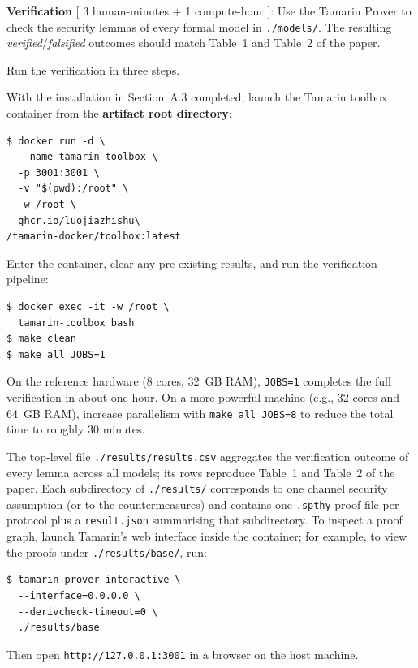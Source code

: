 \begin{compactdesc}

    \item[(E1):] \textbf{Verification} [ 3 human-minutes + 1 compute-hour ]: Use the Tamarin Prover to check the security lemmas of every formal model in \texttt{./models/}. The resulting \textit{verified}/\textit{falsified} outcomes should match Table~1 and Table~2 of the paper.

    \begin{asparadesc}

        \item[How to:] Run the verification in three steps.

       \item[Preparation:]
        With the installation in Section~A.3 completed, launch the Tamarin toolbox container from the \textbf{artifact root directory}:
\begin{verbatim}
$ docker run -d \
  --name tamarin-toolbox \
  -p 3001:3001 \
  -v "$(pwd):/root" \
  -w /root \
  ghcr.io/luojiazhishu\
/tamarin-docker/toolbox:latest
\end{verbatim}

        \item[Execution:]
        Enter the container, clear any pre-existing results, and run the verification pipeline:
\begin{verbatim}
$ docker exec -it -w /root \
  tamarin-toolbox bash
$ make clean
$ make all JOBS=1
\end{verbatim}
        On the reference hardware (8 cores, 32~GB RAM), \texttt{JOBS=1} completes the full verification in about one hour. On a more powerful machine (e.g., 32 cores and 64~GB RAM), increase parallelism with \texttt{make all JOBS=8} to reduce the total time to roughly 30 minutes.

        \item[Results:]
        The top-level file \texttt{./results/results.csv} aggregates the verification outcome of every lemma across all models; its rows reproduce Table~1 and Table~2 of the paper. Each subdirectory of \texttt{./results/} corresponds to one channel security assumption (or to the countermeasures) and contains one \texttt{.spthy} proof file per protocol plus a \texttt{result.json} summarising that subdirectory. To inspect a proof graph, launch Tamarin's web interface inside the container; for example, to view the proofs under \texttt{./results/base/}, run:
\begin{verbatim}
$ tamarin-prover interactive \
  --interface=0.0.0.0 \
  --derivcheck-timeout=0 \
  ./results/base
\end{verbatim}
        Then open \texttt{http://127.0.0.1:3001} in a browser on the host machine.

    \end{asparadesc}

\end{compactdesc}

